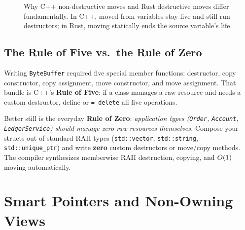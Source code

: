 \begin{figure}[H]
\caption{Why C++ non-destructive moves and Rust destructive moves differ fundamentally. In C++, moved-from variables stay live and still run destructors; in Rust, moving statically ends the source variable's life.}
\label{ch02:fig-cpp-vs-rust-move}
\end{figure}

\subsection{The Rule of Five vs.\ the Rule of Zero}

Writing \texttt{ByteBuffer} required five special member functions: destructor, copy constructor, copy assignment, move constructor, and move assignment. That bundle is C++'s \textbf{Rule of Five}: if a class manages a raw resource and needs a custom destructor, define or \texttt{= delete} all five operations.

Better still is the everyday \textbf{Rule of Zero}: \emph{application types (\texttt{Order}, \texttt{Account}, \texttt{LedgerService}) should manage zero raw resources themselves.} Compose your structs out of standard RAII types (\texttt{std::vector}, \texttt{std::string}, \texttt{std::unique\_ptr}) and write \textbf{zero} custom destructors or move/copy methods. The compiler synthesizes memberwise RAII destruction, copying, and $O(1)$ moving automatically.

\section{Smart Pointers and Non-Owning Views}
\label{ch02:smart-pointers-views}

